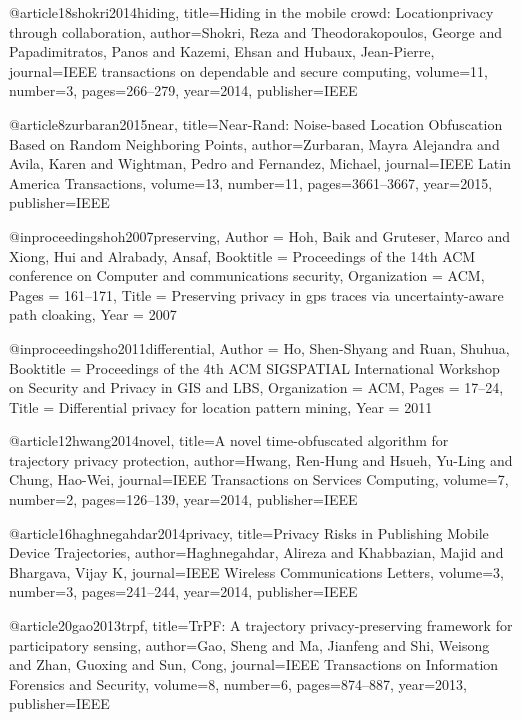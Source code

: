 @article{18shokri2014hiding,
  title={Hiding in the mobile crowd: Locationprivacy through collaboration},
  author={Shokri, Reza and Theodorakopoulos, George and Papadimitratos, Panos and Kazemi, Ehsan and Hubaux, Jean-Pierre},
  journal={IEEE transactions on dependable and secure computing},
  volume={11},
  number={3},
  pages={266--279},
  year={2014},
  publisher={IEEE}
}

@article{8zurbaran2015near,
  title={Near-Rand: Noise-based Location Obfuscation Based on Random Neighboring Points},
  author={Zurbaran, Mayra Alejandra and Avila, Karen and Wightman, Pedro and Fernandez, Michael},
  journal={IEEE Latin America Transactions},
  volume={13},
  number={11},
  pages={3661--3667},
  year={2015},
  publisher={IEEE}
}

@inproceedings{hoh2007preserving,
	Author = {Hoh, Baik and Gruteser, Marco and Xiong, Hui and Alrabady, Ansaf},
	Booktitle = {Proceedings of the 14th ACM conference on Computer and communications security},
	Organization = {ACM},
	Pages = {161--171},
	Title = {Preserving privacy in gps traces via uncertainty-aware path cloaking},
	Year = {2007}}

@inproceedings{ho2011differential,
	Author = {Ho, Shen-Shyang and Ruan, Shuhua},
	Booktitle = {Proceedings of the 4th ACM SIGSPATIAL International Workshop on Security and Privacy in GIS and LBS},
	Organization = {ACM},
	Pages = {17--24},
	Title = {Differential privacy for location pattern mining},
	Year = {2011}}


@article{12hwang2014novel,
  title={A novel time-obfuscated algorithm for trajectory privacy protection},
  author={Hwang, Ren-Hung and Hsueh, Yu-Ling and Chung, Hao-Wei},
  journal={IEEE Transactions on Services Computing},
  volume={7},
  number={2},
  pages={126--139},
  year={2014},
  publisher={IEEE}
  }

  @article{16haghnegahdar2014privacy,
  title={Privacy Risks in Publishing Mobile Device Trajectories},
  author={Haghnegahdar, Alireza and Khabbazian, Majid and Bhargava, Vijay K},
  journal={IEEE Wireless Communications Letters},
  volume={3},
  number={3},
  pages={241--244},
  year={2014},
  publisher={IEEE}
}

@article{20gao2013trpf,
  title={TrPF: A trajectory privacy-preserving framework for participatory sensing},
  author={Gao, Sheng and Ma, Jianfeng and Shi, Weisong and Zhan, Guoxing and Sun, Cong},
  journal={IEEE Transactions on Information Forensics and Security},
  volume={8},
  number={6},
  pages={874--887},
  year={2013},
  publisher={IEEE}
}

